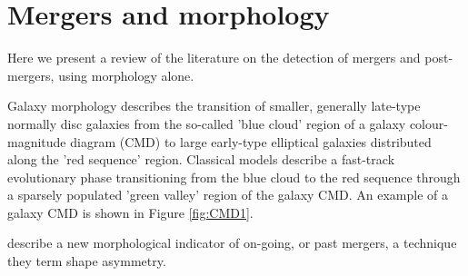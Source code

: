 \section{Mergers and morphology}


Here we present a review of the literature on the detection of mergers and post-mergers, using morphology alone.

Galaxy morphology describes the transition of smaller, generally late-type normally disc galaxies from the so-called 'blue cloud' region of a galaxy colour-magnitude diagram (CMD) to large early-type elliptical galaxies distributed along the 'red sequence' region. Classical models describe a fast-track evolutionary phase transitioning from the blue cloud to the red sequence through a sparsely populated 'green valley' region of the galaxy CMD. An example of a galaxy CMD is shown in Figure \ref{fig:CMD1}.

\citet{2016MNRAS.456.3032P} describe a new morphological indicator of on-going, or past mergers, a technique they term shape asymmetry. 
